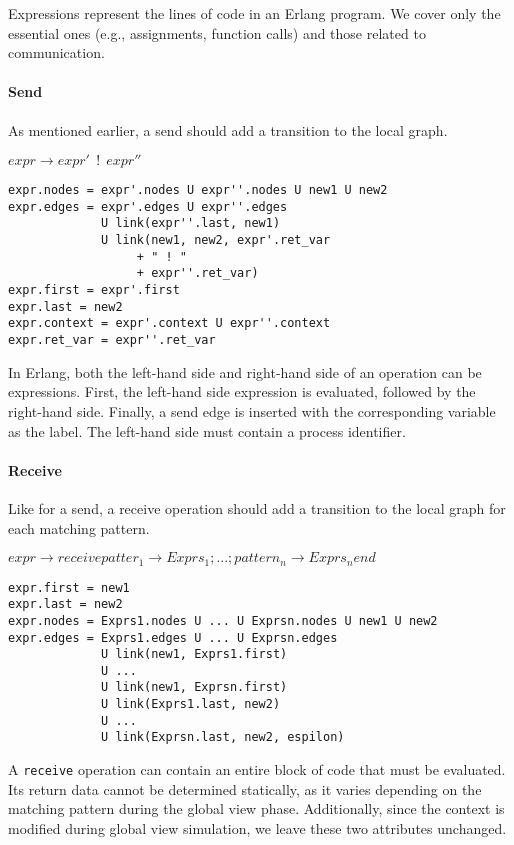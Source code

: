 Expressions represent the lines of code in an Erlang program.  
We cover only the essential ones (e.g., assignments, function calls)  
and those related to communication.  

\paragraph{Send}   
As mentioned earlier, a send should add a transition to the local graph.  

\bigskip

\noindent $expr \to expr'\ \ !\ \ expr''$

\begin{verbatim}
expr.nodes = expr'.nodes U expr''.nodes U new1 U new2
expr.edges = expr'.edges U expr''.edges
             U link(expr''.last, new1)
             U link(new1, new2, expr'.ret_var 
                  + " ! " 
                  + expr''.ret_var)
expr.first = expr'.first
expr.last = new2
expr.context = expr'.context U expr''.context
expr.ret_var = expr''.ret_var
\end{verbatim}

In Erlang, both the left-hand side and right-hand side of an operation  
can be expressions. First, the left-hand side expression is evaluated,  
followed by the right-hand side. Finally, a send edge is inserted with  
the corresponding variable as the label. The left-hand side must contain  
a process identifier.  

\paragraph{Receive}  
Like for a send, a receive operation should add a transition to  
the local graph for each matching pattern.  

\bigskip

\noindent $expr \to receive patter_1 \to Exprs_1; ...; pattern_n \to Exprs_n end$

\begin{verbatim}
expr.first = new1
expr.last = new2
expr.nodes = Exprs1.nodes U ... U Exprsn.nodes U new1 U new2
expr.edges = Exprs1.edges U ... U Exprsn.edges
             U link(new1, Exprs1.first) 
             U ...
             U link(new1, Exprsn.first)
             U link(Exprs1.last, new2)
             U ...
             U link(Exprsn.last, new2, espilon)
\end{verbatim}

A \texttt{receive} operation can contain an entire block of code 
that must be evaluated.  
Its return data cannot be determined statically, as it varies depending  
on the matching pattern during the global view phase. Additionally,  
since the context is modified during global view simulation,  
we leave these two attributes unchanged.  

